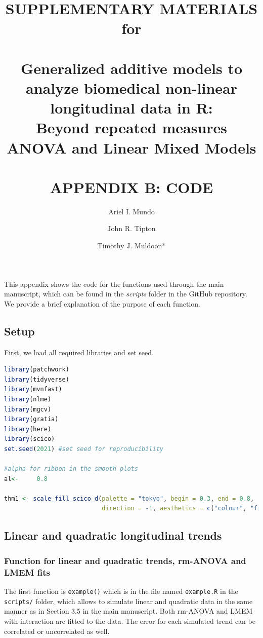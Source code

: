 \documentclass[
]{article}
\author{Ariel I. Mundo \orcidaffila{}}
\author{John R. Tipton \orcidaffilb{}}
\author{Timothy J. Muldoon*}
\affil{tmuldoon@uark.edu}
\title{SUPPLEMENTARY MATERIALS for\\
~\\
\textbf{Generalized additive models to analyze biomedical non-linear longitudinal data in R:}\\
Beyond repeated measures ANOVA and Linear Mixed Models\\
~\\
APPENDIX B: CODE}
\author{}
\date{\vspace{-2.5em}}
\newcommand{\passthrough}[1]{#1}
\begin{document}
\maketitle

\newpage


This appendix shows the code for the functions used through the main manuscript, which can be found in the \emph{scripts} folder in the GitHub repository. We provide a brief explanation of the purpose of each function.

\hypertarget{setup}{%
\subsection{Setup}\label{setup}}

First, we load all required libraries and set seed.

\begin{lstlisting}[language=R]
library(patchwork)
library(tidyverse)
library(mvnfast)
library(nlme)
library(mgcv)
library(gratia)
library(here)
library(scico)
set.seed(2021) #set seed for reproducibility

#alpha for ribbon in the smooth plots
al<-     0.8

thm1 <- scale_fill_scico_d(palette = "tokyo", begin = 0.3, end = 0.8,
                           direction = -1, aesthetics = c("colour", "fill"))
\end{lstlisting}

\hypertarget{linear-and-quadratic-longitudinal-trends}{%
\subsection{Linear and quadratic longitudinal trends}\label{linear-and-quadratic-longitudinal-trends}}

\hypertarget{function-for-linear-and-quadratic-trends-rm-anova-and-lmem-fits}{%
\subsubsection{Function for linear and quadratic trends, rm-ANOVA and LMEM fits}\label{function-for-linear-and-quadratic-trends-rm-anova-and-lmem-fits}}

The first function is \passthrough{\lstinline!example()!} which is in the file named \passthrough{\lstinline!example.R!} in the \passthrough{\lstinline!scripts/!} folder, which allows to simulate linear and quadratic data in the same manner as in Section 3.5 in the main manuscript. Both rm-ANOVA and LMEM with interaction are fitted to the data. The error for each simulated trend can be correlated or uncorrelated as well.
\end{document}

